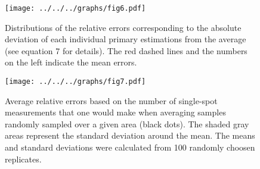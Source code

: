 \documentclass[12pt,a4paper]{scrartcl}
\begin{document}
\clearpage
\newpage

\begin{figure}[h]
	\centering
	\texttt{[image: ../../../graphs/fig6.pdf]}
	\caption{Distributions of the relative errors corresponding to the absolute deviation of each individual primary estimations from the average (see equation 7 for details). The red dashed lines and the numbers on the left indicate the mean errors.}
\end{figure}

\clearpage

\begin{figure}[h]
	\centering
	\texttt{[image: ../../../graphs/fig7.pdf]}
	\caption{Average relative errors based on the number of single-spot measurements that one would make when averaging samples randomly sampled over a given area (black dots). The shaded gray areas represent the standard deviation around the mean. The means and standard deviations were calculated from 100 randomly choosen replicates.}
\end{figure}
\end{document}
